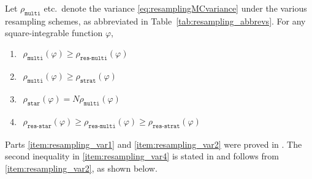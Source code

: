 \begin{prop}\label{thm:resampling_var_compare}
Let $\rho_{\texttt{multi}}$ etc.\ denote the variance \eqref{eq:resamplingMCvariance} under the various resampling schemes, as abbreviated in Table~\ref{tab:resampling_abbrevs}.
For any square-integrable function $\varphi$,
\begin{enumerate}[label=(\alph*)]
\item \label{item:resampling_var1} \hspace{5pt}
$\begin{aligned}
    \rho_{\texttt{multi}}(\varphi) 
    \geq \rho_{\texttt{res-multi}}(\varphi)
\end{aligned}$
\item \label{item:resampling_var2} \hspace{5pt}
$\begin{aligned}
    \rho_{\texttt{multi}}(\varphi) 
    \geq \rho_{\texttt{strat}}(\varphi)
\end{aligned}$
\item \label{item:resampling_var3} \hspace{5pt}
$\begin{aligned}
    \rho_{\texttt{star}}(\varphi) 
    = N \rho_{\texttt{multi}}(\varphi)
\end{aligned}$
\item \label{item:resampling_var4} \hspace{5pt}
$\begin{aligned}
    \rho_{\texttt{res-star}}(\varphi) 
    \geq \rho_{\texttt{res-multi}}(\varphi) 
    \geq \rho_{\texttt{res-strat}}(\varphi)
\end{aligned}$
\end{enumerate}
\end{prop}
Parts \ref{item:resampling_var1} and \ref{item:resampling_var2} were proved in \textcite[Section 3]{douc2005}. The second inequality in \ref{item:resampling_var4} is stated in \textcite[p.9]{gerber2017} and follows from \ref{item:resampling_var2}, as shown below.

